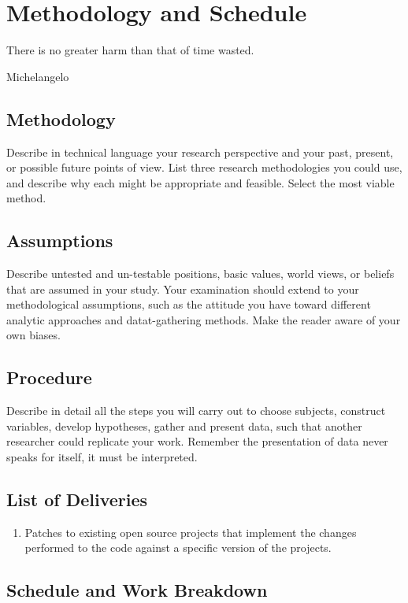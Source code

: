 \chapter{Methodology and Schedule} 
\epigraph{There is no greater harm than that of time wasted.}{Michelangelo}

\section{Methodology}
Describe in technical language your research perspective and your past, present, or possible future points of view.
List three research methodologies you could use, and describe why each might be appropriate and feasible. Select the most viable method.

\section{Assumptions}
Describe untested and un-testable positions, basic values, world views, or beliefs that are assumed in your study.
Your examination should extend to your methodological assumptions, such as the attitude you have toward different analytic approaches and datat-gathering methods. Make the reader aware of your own biases.

\section{Procedure}
Describe in detail all the steps you will carry out to choose subjects, construct variables, develop hypotheses, gather and present data, such that another researcher could replicate your work.
Remember the presentation of data never speaks for itself, it must be interpreted.

\section{List of Deliveries}
\begin{enumerate}
\item Patches to existing open source projects that implement the changes performed to the code against a specific version of the projects.
\end{enumerate}

\section{Schedule and Work Breakdown}

